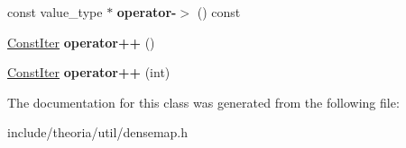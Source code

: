 \begin{DoxyCompactItemize}
const value\+\_\+type $\ast$ {\bfseries operator-\/$>$} () const
\item 
\mbox{\label{classtheoria_1_1util_1_1densemap_1_1ConstIter_a7dba18b534ffdf71354b4b5789aea3a1}} 
\hyperlink{classtheoria_1_1util_1_1densemap_1_1ConstIter}{Const\+Iter} {\bfseries operator++} ()
\item 
\mbox{\label{classtheoria_1_1util_1_1densemap_1_1ConstIter_a8ca98e8a181d846c7c8412192f59da95}} 
\hyperlink{classtheoria_1_1util_1_1densemap_1_1ConstIter}{Const\+Iter} {\bfseries operator++} (int)
\end{DoxyCompactItemize}


The documentation for this class was generated from the following file\+:\begin{DoxyCompactItemize}
\item 
include/theoria/util/densemap.\+h\end{DoxyCompactItemize}

